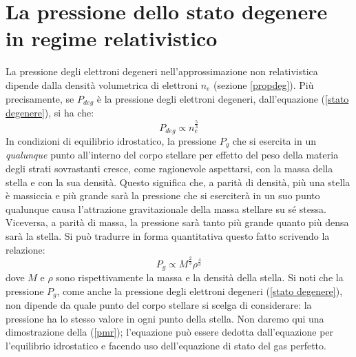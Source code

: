 \section{La pressione dello stato degenere in regime relativistico}
\label{climit}
La pressione degli elettroni degeneri nell'approssimazione non relativistica dipende dalla densit\`{a} volumetrica di elettroni $n_{e}$ (sezione \ref{propdeg}). Più precisamente, se $P_{deg}$ è la pressione degli elettroni degeneri, dall'equazione (\ref{stato degenere}), si ha che:
\begin{equation}\label{prop53}
P_{deg} \propto n_{e}^{\frac{5}{3}}
\end{equation}
In condizioni di equilibrio idrostatico, la pressione $P_{g}$ che si esercita in un \emph{qualunque} punto all'interno del corpo stellare per effetto del peso della materia degli strati sovrastanti cresce, come ragionevole aspettarsi, con la massa della stella e con la sua densit\`{a}. Questo significa che, a parit\`{a} di densit\`{a}, più una stella è massiccia e più grande sar\`{a} la pressione che si eserciter\`{a} in un suo punto qualunque causa l'attrazione gravitazionale della massa stellare su sé stessa. Viceversa, a parit\`{a} di massa, la pressione sar\`{a} tanto più grande quanto più densa sar\`{a} la stella. Si può tradurre in forma quantitativa questo fatto scrivendo la relazione:
\begin{equation}\label{pmr}
P_{g}\propto M^{\frac{2}{3}}\rho^{\frac{4}{3}}
\end{equation}
dove $M$ e $\rho$ sono rispettivamente la massa e la densit\`{a} della stella. Si noti che la pressione $P_{g}$, come anche la pressione degli elettroni degeneri (\ref{stato degenere}), non dipende da quale punto del corpo stellare si scelga di considerare: la pressione ha lo stesso valore in ogni punto della stella. Non daremo qui una dimostrazione della (\ref{pmr}); l'equazione può essere dedotta dall'equazione per l'equilibrio idrostatico e facendo uso dell'equazione di stato del gas perfetto.
\par
